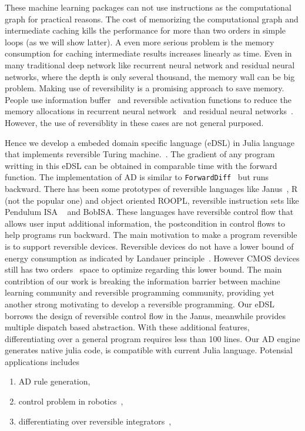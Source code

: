 \documentclass[aps,twocolumn,longbibliography,english,superscriptaddress,prr]{revtex4-1}
\newcommand{\<}{\langle}
\renewcommand{\>}{\rangle}
\theoremstyle{definition}\newtheorem{definition}{\textit{Definition}}
\begin{document}

These machine learning packages can not use instructions as the computational graph for practical reasons. The cost of memorizing the computational graph and intermediate caching kills the performance for more than two orders in simple loops (as we will show latter).
A even more serious problem is the memory consumption for caching intermediate results increases linearly as time. Even in many traditional deep network like recurrent neural network and residual neural networks, where the depth is only several thousand, the memory wall can be big problem.
Making use of reversibility is a promising approach to save memory. People use information buffer~\cite{Maclaurin2015} and reversible activation functions to reduce the memory allocations in recurrent neural network~\cite{MacKay2018} and residual neural networks~\cite{Behrmann2018}. However, the use of reversiblity in these cases are not general purposed.

Hence we develop a embeded domain specific language (eDSL) in Julia language that implements reversible Turing machine.~\cite{Perumalla2013,Frank2017}.
The gradient of any program writting in this eDSL can be obtained in comparable time with the forward function. The implementation of AD is similar to \texttt{ForwardDiff}~\cite{Revels2016} but runs backward.
There has been some prototypes of reversible languages like Janus~\cite{Lutz1986}, R (not the popular one) and object oriented ROOPL, reversible instruction sets like Pendulum ISA ~\cite{Vieri1999} and BobISA. These languages have reversible control flow that allows user input additional information, the postcondition in control flows to help programs run backward.
    The main motivation to make a program reversible is to support reversible devices. Reversible devices do not have a lower bound of energy consumption as indicated by Landauer principle~\cite{Landauer1961}. However CMOS devices still has two orders~\cite{Frank2017} space to optimize regarding this lower bound.
    The main contribtion of our work is breaking the information barrier between machine learning community and reversible programming community, providing yet another strong motivating to develop a reversible programming.
    Our eDSL borrows the design of reversible control flow in the Janus, meanwhile provides multiple dispatch based abstraction. With these additional features, differentiating over a general program requires less than 100 lines.
Our AD engine generates native julia code, is compatible with current Julia language.
Potensial applications includes
\begin{enumerate}
    \item AD rule generation,
    \item control problem in robotics~\cite{Giftthaler2017},
    \item differentiating over reversible integrators~\cite{Laikov2018},
\end{enumerate}
\end{document}
